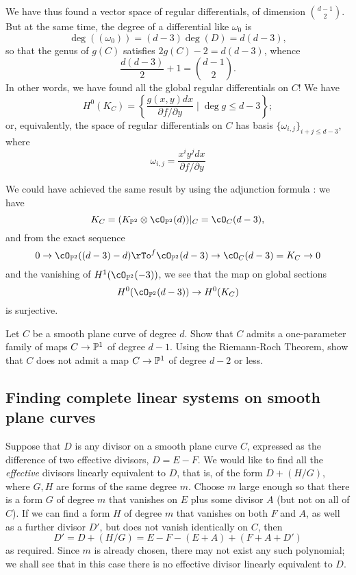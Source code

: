 We have thus found a vector space of regular differentials, of dimension $\binom{d-1}{2}$. But at the same time, the degree of a differential like $\omega_0$ is
$$
\deg((\omega_0)) = (d-3)\deg(D) = d(d-3),
$$
so that the genus of $g(C)$ satisfies
$2g(C)-2 = d(d-3)$, whence
$$
\frac{d(d-3)}{2} + 1 = \binom{d-1}{2}.
$$
In other words, we have found all the global regular differentials on $C$! We have
$$
H^0(K_C) = \left\{ \frac{g(x,y)dx}{\partial f/\partial y} \mid \deg g \leq d-3\right\};
$$
or, equivalently, the space of regular differentials on $C$ has basis $\{\omega_{i,j} \}_{i+j \leq d-3}$, where
$$
\omega_{i,j} =  \frac{x^iy^jdx}{\partial f/\partial y}
$$

We could have achieved the same result by using the adjunction formula : we have
$$
K_C = (K_{\PP^2} \otimes \cO_{\PP^2}(d))|_C = \cO_C(d-3),
$$
and from the exact sequence
$$
0 \to \cO_{\PP^2}((d-3)-d) \rTo^f \cO_{\PP^2}(d-3) \to \cO_C(d-3)=K_C \to 0
$$
and the vanishing of $H^1(\cO_{\PP^2}(-3))$, we see that the map on global sections
$$
H^0(\cO_{\PP^2}(d-3)) \to H^0(K_C)
$$
is surjective. 

\begin{exercise}\label{gonality of smooth plane curve}
Let $C$ be a smooth plane curve of degree $d$. Show that $C$ admits a one-parameter family of maps $C \to \PP^1$ of degree $d-1$. Using the Riemann-Roch Theorem, show that $C$ does not admit a map $C \to \PP^1$ of degree $d-2$ or less.
\end{exercise}


\subsection{Finding complete linear systems on smooth plane curves}

Suppose that $D$ is any divisor on a smooth plane curve $C$, expressed as the difference of
two effective divisors, $D= E-F$. We would like to find all the \emph{effective} divisors linearly equivalent to $D$, that is, of the form
$D + (H/G)$, where $G, H$ are forms of the same degree $m$. Choose $m$ large enough so that
there is
 a form $G$ of degree $m$ that vanishes on $E$ plus some divisor $A$ (but not on all of $C$). If we can find a form $H$ of degree $m$ that vanishes on both $F$ and $A$, as well as a further divisor $D'$, but does not vanish identically on $C$, then
$$
D' = D + (H/G) = E- F - (E+A)+(F+A+D')
$$
as required. Since $m$ is already chosen, there may not exist any such polynomial; we shall see that in this case there is no effective divisor linearly equivalent to $D$. 

